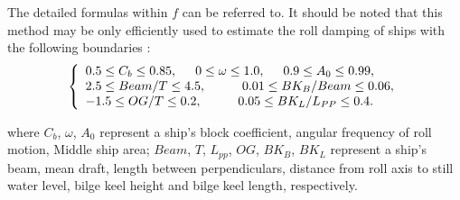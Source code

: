 The detailed formulas within $f$ can be referred to\parencite{ikeda_velocity_1979, kawahara_simple_2011}. It should be noted that this method may be only efficiently used to estimate the roll damping of ships with the following boundaries \parencite{kawahara_simple_2011}:
\begin{equation}
    \label{eq:SI_limits}
     \left\{
     \begin{array}{ll}
    0.5 \leq C_b \leq 0.85,\hspace{0.5cm} 
    0 \leq \omega \leq 1.0,
    \hspace{0.5cm}
    0.9 \leq A_0 \leq 0.99,\\
    2.5\leq Beam/T \leq 4.5, \hspace{1cm}
    0.01 \leq BK_B/Beam \leq 0.06, \\
        -1.5 \leq OG/T \leq 0.2,
     \hspace{1cm}
    0.05 \leq BK_L/L_{PP} \leq 0.4.
    \end{array}
    \right.
\end{equation}

where $C_b$, $\omega$, $A_0$ represent a ship's block coefficient, angular frequency of roll motion, Middle ship area;  $Beam$, $T$, $L_{pp}$, $OG$, $BK_B$, $BK_L$ represent a ship's beam, mean draft, length between perpendiculars, distance from roll axis to still water level, bilge keel height and bilge keel length, respectively.




